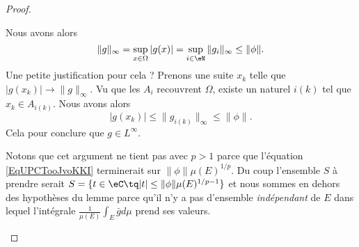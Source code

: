 \begin{proof}
\begin{subproof}
		Nous avons alors
		\begin{equation}
			\| g \|_{\infty}=\sup_{x\in \Omega}| g(x) |=\sup_{i\in \eN}\| g_i \|_{\infty}\leq \| \phi \|.
		\end{equation}
		Une petite justification pour cela ? Prenons une suite \( x_k\) telle que \( | g(x_k) |\to \| g \|_{\infty}\). Vu que les \( A_i\) recouvrent \( \Omega\), existe un naturel \( i(k)\) tel que \( x_k\in A_{i(k)}\). Nous avons alors
		\begin{equation}
			| g(x_k) |\leq \| g_{i(k)} \|_{\infty}\leq \| \phi \|.
		\end{equation}
		Cela pour conclure que \( g\in L^{\infty}\).

		Notons que cet argument ne tient pas avec \( p> 1\) parce que l'équation \eqref{EqUPCTooJvoKKI} terminerait sur \( \| \phi \|\mu(E)^{1/p}\). Du coup l'ensemble \( S\) à prendre serait \( S=\{ t\in \eC\tq | t |\leq \| \phi \|\mu(E)^{1/p-1} \}\) et nous sommes en dehors des hypothèses du lemme parce qu'il n'y a pas d'ensemble \emph{indépendant} de \( E\) dans lequel l'intégrale \( \frac{1}{ \mu(E) }\int_{E}\bar gd\mu\) prend ses valeurs.

		\spitem[\( 1<p<\infty\)]


\end{subproof}
\end{proof}
